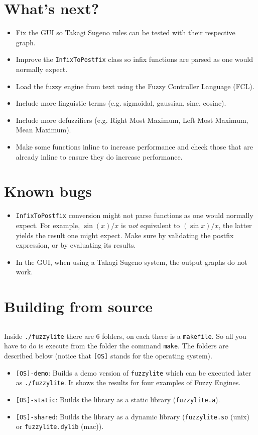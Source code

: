 \section{What's next?}
	\begin{itemize}
		\item Fix the GUI so Takagi Sugeno rules can be tested with their respective graph.
		\item Improve the \texttt{InfixToPostfix} class so infix functions are parsed as one would normally expect.
		\item Load the fuzzy engine from text using the Fuzzy Controller Language (FCL).
		\item Include more linguistic terms (e.g. sigmoidal, gaussian, sine, cosine).
		\item Include more defuzzifiers (e.g. Right Most Maximum, Left Most Maximum, Mean Maximum).
		\item Make some functions inline to increase performance and check those that are already inline to ensure they do increase performance.
	\end{itemize}
	
	\section{Known bugs}
	\begin{itemize}
		\item \texttt{InfixToPostfix} conversion might not parse functions as one would normally expect. For example, $\sin (x) / x$ is \emph{not} equivalent to $(\sin x) / x$, the latter yields the result one might expect. Make sure by validating the postfix expression, or by evaluating its results.
		\item In the GUI, when using a Takagi Sugeno system, the output graphs do not work.
	\end{itemize}
	
\section{Building from source}

\subsection{\fl}
	Inside \texttt{./fuzzylite} there are 6 folders, on each there is a
	\texttt{makefile}. So all you have to do is execute from the folder the
	command \texttt{make}. The folders are described below (notice that
	\texttt{[OS]} stands for the operating system).
	\begin{itemize}	
	  \item \texttt{[OS]-demo}: Builds a demo version of \texttt{fuzzylite} which
	  can be executed later as \texttt{./fuzzylite}. It shows the results for four
	  examples of Fuzzy Engines.
	  \item \texttt{[OS]-static}: Builds the library as a static library
	  (\texttt{fuzzylite.a}).
	  \item \texttt{[OS]-shared}: Builds the library as a dynamic library
	  (\texttt{fuzzylite.so} (unix) or \texttt{fuzzylite.dylib} (mac)).
\end{itemize}

